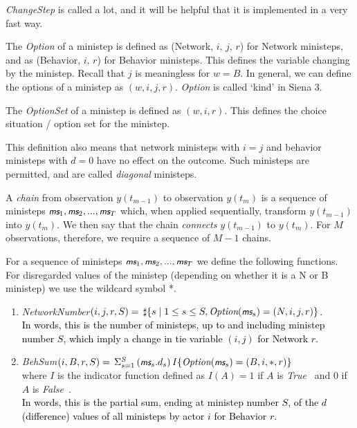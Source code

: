 \documentclass[a4paper,12pt,fleqn]{article}
\newcommand{\nnm}[1]{\textsf{\small\textit{#1}\ }}
\newcommand{\ms}{\textsl{\textsf{\small ms}}} %
\newcommand{\adda}[1]{{#1}}  %
\newcommand{\addc}[1]{{\textcolor[named]{Black}{#1}}}  %
\begin{document}
\textit{ChangeStep} is called a lot, and it will be helpful
that it is implemented in a very fast way.

The \textit{\adda{Option}} of a ministep is defined as
(Network, $i,\, j,\, r$) for Network ministeps,
and as (Behavior, $i, \, r$) for Behavior ministeps.
This defines the variable changing by the ministep.
\adda{Recall that $j$ is meaningless for $w=B$.
In general, we can define the options of a ministep as $(w,i,j,r)$.}
\adda{\textit{Option} is called `kind' in Siena 3.}

The \adda{\textit{OptionSet}} of a ministep is defined as
$(w,i,r)$.
This defines the choice situation / option set for the ministep.


This definition also means that network ministeps with $i = j$ and behavior ministeps
with $d = 0$ have no effect on the outcome. Such ministeps are permitted,
and are called \emph{diagonal} ministeps.

A \emph{chain} from observation $y(t_{m-1})$
to observation $y(t_m)$ is a sequence of ministeps $\ms_1 , \ms_2 , ..., \ms_T$
which, when applied sequentially, transform $y(t_{m-1})$ into $y(t_{m})$.
We then say that the chain \emph{connects}  $y(t_{m-1})$ to $y(t_m)$.
For $M$ observations, therefore, we require a sequence of $M-1$ chains.

For a sequence of ministeps $\ms_1 , \ms_2 , ..., \ms_T$
we define the following functions.
For disregarded values of the ministep (depending on whether it is a N or B
ministep) we use the wildcard symbol *.
\begin{enumerate}[resume]
\item \textit{NetworkNumber}$(i,j,r,S)  =  \,
             \sharp\{ s \mid 1 \leq s \leq S, \textit{\adda{Option}}(\ms_s) = (N,i,j,r)  \} $.\\
     \addc{In words, this is the number of ministeps, up to and including ministep number $S$,
      which imply a change in tie variable $(i,j)$ for Network $r$.}
\item \textit{BehSum}$(i,B,r,S)  = \,   \Sigma_{s=1}^S \, (\ms_s.d_s)\,
                      I\{ \textit{\adda{Option}}(\ms_s) = (B,i,*,r) \} $\\
      where $I$ is the indicator function defined as $I(A) = 1$ if $A$ is \nnm{True}
      and 0 if $A$ is \nnm{False}.\\
     \addc{In words, this is the partial sum, ending at ministep number $S$,
      of the $d$ (difference) values of all ministeps by actor $i$ for Behavior $r$.}
\end{enumerate}
\end{document}
